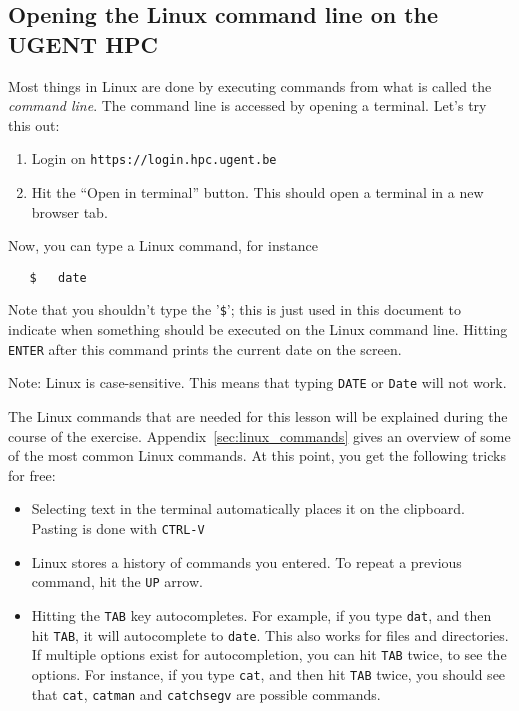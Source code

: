 \documentclass[a4paper]{article}
\begin{document}
\subsection{Opening the Linux command line on the UGENT HPC}
%
\par
Most things in Linux are done by executing commands from what is called the \emph{command line}. The command line is accessed by opening a terminal. Let's try this out:
%
\begin{enumerate}
	\item Login on \texttt{https://login.hpc.ugent.be}
	\item Hit the ``Open in terminal'' button. This should open a terminal in a new browser tab.
\end{enumerate}
%
Now, you can type a Linux command, for instance
%
\begin{verbatim}
   $   date
\end{verbatim}
%
Note that you shouldn't type the '\texttt{\$}'; this is just used in this document to indicate when something should be executed on the Linux command line. Hitting \texttt{ENTER} after this command prints the current date on the screen.
%
\par
Note: Linux is case-sensitive. This means that typing \verb+DATE+ or \verb+Date+ will not work.
%
\par
The Linux commands that are needed for this lesson will be explained during the course of the exercise. Appendix~\ref{sec:linux_commands} gives an overview of some of the most common Linux commands. At this point, you get the following tricks for free:
%
\begin{itemize}
	\item Selecting text in the terminal automatically places it on the clipboard. Pasting is done with \texttt{CTRL-V}
	\item Linux stores a history of commands you entered. To repeat a previous command, hit the \texttt{UP} arrow.
	\item Hitting the \texttt{TAB} key autocompletes. For example, if you type \texttt{dat}, and then hit \texttt{TAB}, it will autocomplete to \texttt{date}. This also works for files and directories. If multiple options exist for autocompletion, you can hit \texttt{TAB} twice, to see the options. For instance, if you type \texttt{cat}, and then hit \texttt{TAB} twice, you should see that \texttt{cat}, \texttt{catman} and \texttt{catchsegv} are possible commands.
\end{itemize}
%
\end{document}
